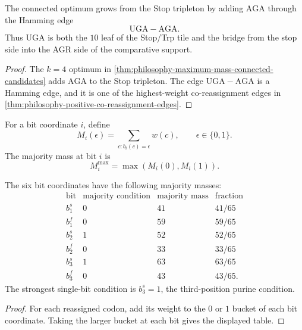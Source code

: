 \begin{corollary}
\label{cor:philosophy-uga-stop-agr-bridge}
The connected optimum grows from the Stop tripleton by adding
$\mathrm{AGA}$ through the Hamming edge
$$
  \mathrm{UGA}-\mathrm{AGA}.
$$
Thus $\mathrm{UGA}$ is both the $10$ leaf of the Stop/Trp tile and the
bridge from the stop side into the AGR side of the comparative support.
\end{corollary}
\begin{proof}
The $k=4$ optimum in
\autoref{thm:philosophy-maximum-mass-connected-candidates} adds
$\mathrm{AGA}$ to the Stop tripleton. The edge
$\mathrm{UGA}-\mathrm{AGA}$ is a Hamming edge, and it is one of the
highest-weight co-reassignment edges in
\autoref{thm:philosophy-positive-co-reassignment-edges}.
\end{proof}

\begin{definition}
\label{def:philosophy-bit-majority-mass}
For a bit coordinate $i$, define
$$
  M_{i}(\epsilon)=\sum_{c:b_{i}(c)=\epsilon}w(c),
  \qquad
  \epsilon\in\{0,1\}.
$$
The majority mass at bit $i$ is
$$
  M_{i}^{\max}=\max(M_{i}(0),M_{i}(1)).
$$
\end{definition}

\begin{theorem}
\label{thm:philosophy-bit-level-reassignment-concentration}
The six bit coordinates have the following majority masses:
$$
\begin{array}{c|c|r|r}
  \text{bit} & \text{majority condition} & \text{majority mass}
    & \text{fraction}\\
\hline
  b_{1}^{s} & 0 & 41 & 41/65\\
  b_{1}^{f} & 0 & 59 & 59/65\\
  b_{2}^{s} & 1 & 52 & 52/65\\
  b_{2}^{f} & 0 & 33 & 33/65\\
  b_{3}^{s} & 1 & 63 & 63/65\\
  b_{3}^{f} & 0 & 43 & 43/65.
\end{array}
$$
The strongest single-bit condition is $b_{3}^{s}=1$, the third-position
purine condition.
\end{theorem}
\begin{proof}
For each reassigned codon, add its weight to the $0$ or $1$ bucket of
each bit coordinate. Taking the larger bucket at each bit gives the
displayed table.
\end{proof}

